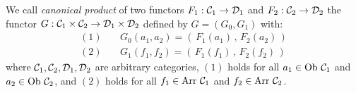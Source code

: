 \begin{defin}\label{Fun:def:canonical:product}
    We call {\em canonical product} of two functors $F_{1}:\mbox{${\cal C}_{1}$}\to\mbox{${\cal D}_{1}$}$ and
    $F_{2}:\mbox{${\cal C}_{2}$}\to\mbox{${\cal D}_{2}$}$ the functor $G:\mbox{${\cal C}_{1}$}\times\mbox{${\cal C}_{2}$}\to\mbox{${\cal D}_{1}$}\times\mbox{${\cal D}_{2}$}$
    defined by $G=(G_{0},G_{1})$ with:
        \begin{eqnarray*}
            (1)&\ &G_{0}(a_{1},a_{2}) = (\,F_{1}(a_{1})\,,\,F_{2}(a_{2})\,)\\
            (2)&\ &G_{1}(f_{1},f_{2}) = (\,F_{1}(f_{1})\,,\,F_{2}(f_{2})\,)
        \end{eqnarray*}
    where $\mbox{${\cal C}_{1}$},\mbox{${\cal C}_{2}$}, \mbox{${\cal D}_{1}$}, \mbox{${\cal D}_{2}$}$ are arbitrary categories, $(1)$ holds 
    for all $a_{1}\in\mbox{\rm Ob}\ \mbox{${\cal C}_{1}$}$ and $a_{2}\in\mbox{\rm Ob}\ \mbox{${\cal C}_{2}$}$, and $(2)$ holds 
    for all $f_{1}\in\mbox{\rm Arr}\ \mbox{${\cal C}_{1}$}$ and $f_{2}\in\mbox{\rm Arr}\ \mbox{${\cal C}_{2}$}$.
\end{defin}
